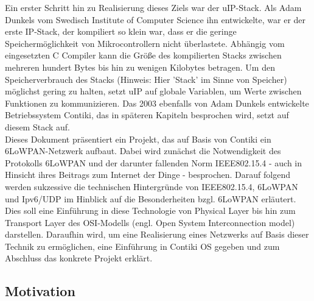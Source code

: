 	Ein erster Schritt hin zu Realisierung dieses Ziels war der uIP-Stack. Als Adam Dunkels vom Swedisch Institute of Computer Science ihn entwickelte, war er der erste IP-Stack, der kompiliert so klein war, dass er die geringe Speichermöglichkeit von Mikrocontrollern nicht überlastete. Abhängig vom eingesetzten C Compiler kann die Größe des kompilierten Stacks zwischen mehreren hundert Bytes bis hin zu wenigen Kilobytes betragen. Um den Speicherverbrauch des Stacks (Hinweis: Hier 'Stack' im Sinne von Speicher) möglichst gering zu halten, setzt uIP auf globale Variablen, um Werte zwischen Funktionen zu kommunizieren.\cite[S.5]{dunkelsuip} Das 2003 ebenfalls von Adam Dunkels entwickelte Betriebssystem Contiki, das in späteren Kapiteln besprochen wird, setzt auf diesem Stack auf.\\
	Dieses Dokument präsentiert ein Projekt, das auf Basis von Contiki ein 6LoWPAN-Netzwerk aufbaut. Dabei wird zunächst die Notwendigkeit des Protokolls 6LoWPAN und der darunter fallenden Norm IEEE802.15.4 - auch in Hinsicht ihres Beitrags zum Internet der Dinge - besprochen. Darauf folgend werden sukzessive die technischen Hintergründe von IEEE802.15.4, 6LoWPAN und Ipv6/UDP im Hinblick auf die Besonderheiten bzgl. 6LoWPAN erläutert. Dies soll eine Einführung in diese Technologie von Physical Layer bis hin zum Transport Layer des OSI-Modells (engl. Open System Interconnection model) darstellen. Daraufhin wird, um eine Realisierung eines Netzwerks auf Basis dieser Technik zu ermöglichen, eine Einführung in Contiki OS gegeben und zum Abschluss das konkrete Projekt erklärt. 

\subsection{Motivation}

